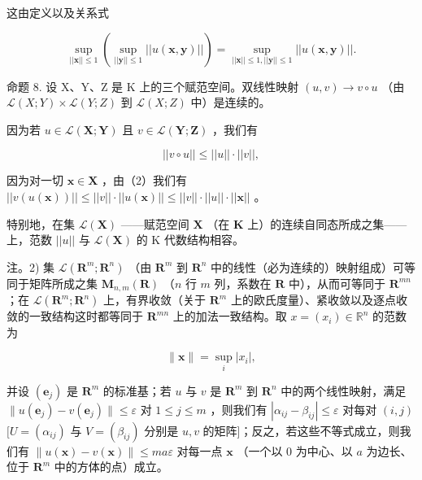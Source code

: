 这由定义以及关系式

\[
\sup _ {| | \boldsymbol {x} | | \leqslant 1} \left(\sup _ {| | \boldsymbol {y} | | \leqslant 1} | | u (\boldsymbol {x}, \boldsymbol {y}) | |\right) = \sup _ {| | \boldsymbol {x} | | \leqslant 1, | | \boldsymbol {y} | | \leqslant 1} | | u (\boldsymbol {x}, \boldsymbol {y}) | |.
\]

命题 8. 设 X、Y、Z 是 K 上的三个赋范空间。双线性映射 \((u, v) \to v \circ u\) （由 \(\mathcal{L}(X; Y) \times \mathcal{L}(Y; Z)\) 到 \(\mathcal{L}(X; Z)\) 中）是连续的。

因为若 \(u \in \mathcal{L}(\mathbf{X};\mathbf{Y})\) 且 \(v \in \mathcal{L}(\mathbf{Y};\mathbf{Z})\) ，我们有

\[
\left| \left| v \circ u \right| \right| \leqslant \left| \left| u \right| \right| \cdot \left| \left| v \right| \right|,\tag{3}
\]

因为对一切 \(\pmb{x} \in \mathbf{X}\) ，由（2）我们有 \(||v(u(\pmb{x}))|| \leqslant ||v|| \cdot ||u(\pmb{x})|| \leqslant ||v|| \cdot ||u|| \cdot ||\pmb{x}||\) 。

特别地，在集 \(\mathcal{L}(\mathbf{X})\) ——赋范空间 \(\mathbf{X}\) （在 \(\mathbf{K}\) 上）的连续自同态所成之集——上，范数 \(||u||\) 与 \(\mathcal{L}(\mathbf{X})\) 的 K 代数结构相容。

注。2) 集 \(\mathcal{L}(\mathbf{R}^{m};\mathbf{R}^{n})\) （由 \(\mathbf{R}^{m}\) 到 \(\mathbf{R}^{n}\) 中的线性（必为连续的）映射组成）可等同于矩阵所成之集 \(\mathbf{M}_{n,m}(\mathbf{R})\) （\(n\) 行 \(m\) 列，系数在 \(\mathbf{R}\) 中），从而可等同于 \(\mathbf{R}^{mn}\) ；在 \(\mathcal{L}(\mathbf{R}^{m};\mathbf{R}^{n})\) 上，有界收敛（关于 \(\mathbf{R}^{m}\) 上的欧氏度量）、紧收敛以及逐点收敛的一致结构这时都等同于 \(\mathbf{R}^{mn}\) 上的加法一致结构。取 \(x = (x_{i})\in \mathbb{R}^{n}\) 的范数为

\[
\| \boldsymbol {x} \| = \sup _ {i} | x _ {i} |,
\]

并设 \((\pmb{e}_j)\) 是 \(\mathbf{R}^m\) 的标准基；若 \(u\) 与 \(v\) 是 \(\mathbf{R}^m\) 到 \(\mathbf{R}^n\) 中的两个线性映射，满足 \(\| u(\pmb{e}_j) - v(\pmb{e}_j)\| \leqslant \varepsilon\) 对 \(1 \leqslant j \leqslant m\) ，则我们有 \(|\alpha_{ij} - \beta_{ij}| \leqslant \varepsilon\) 对每对 \((i,j)\) \([U = (\alpha_{ij})\) 与 \(V = (\beta_{ij})\) 分别是 \(u, v\) 的矩阵{]}；反之，若这些不等式成立，则我们有 \(\| u(\pmb{x}) - v(\pmb{x})\| \leqslant ma\varepsilon\) 对每一点 \(\pmb{x}\) （一个以 0 为中心、以 \(a\) 为边长、位于 \(\mathbf{R}^m\) 中的方体的点）成立。

